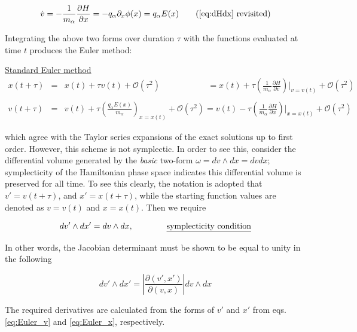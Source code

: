 \documentclass[11pt,titlepage]{report}
\begin{document}
\begin{equation*}
\dot{v} =  -\frac{1}{m_{\alpha}}\frac{\partial H}{\partial x} = -q_{\alpha}\partial_x\phi(x) = q_{\alpha}E(x) \tag{\ref{eq:dHdx} revisited}
\end{equation*}

\noindent Integrating the above two forms over duration $\tau$ with the functions evaluated at time $t$ produces the Euler method:

\vspace{2em}
\underline{Standard Euler method}\\[.3em]
\begin{eqnarray}
x(t + \tau ) & = & x(t) + \tau v(t) + \mathcal{O}(\tau^2) \qquad \qquad \quad \,\,\,\, = x(t) + \tau \left(\frac{1}{m_{\alpha}}\frac{\partial H}{\partial v}\right)\biggr|_{v = v(t)} + \mathcal{O}(\tau^2) \label{eq:Euler_x} \\
&& \nonumber \\
v(t + \tau ) & = & v(t) + \tau \left(\frac{q_{\alpha} E(x)}{m_{\alpha}}\right)_{x = x(t)} + \mathcal{O}(\tau^2) = v(t) - \tau \left(\frac{1}{m_{\alpha}} \frac{\partial H}{\partial x}\right)\biggr|_{x = x(t)} + \mathcal{O}(\tau^2) \label{eq:Euler_v}
\end{eqnarray}

\noindent which agree with the Taylor series expansions of the exact solutions up to first order. However, this scheme is not symplectic. In order to see this, consider the differential volume generated by the \emph{basic} two-form $\omega = dv \wedge dx = dvdx$; symplecticity of the Hamiltonian phase space indicates this differential volume is preserved for all time. To see this clearly, the notation is adopted that $v' = v(t + \tau )$, and $x' = x(t + \tau )$, while the starting function values are denoted as $v = v(t)$ and $x = x(t)$. Then we require

\begin{equation} dv' \wedge dx' = dv \wedge dx , \qquad \qquad \textrm{\underline{symplecticity condition}}\label{eq:symplectic_condition}\end{equation}

\noindent In other words, the Jacobian determinant must be shown to be equal to unity in the following

$$dv' \wedge dx'  =  \left|\frac{\partial (v',x')}{\partial(v,x)}\right| dv \wedge dx $$

The required derivatives are calculated from the forms of $v'$ and $x'$ from eqs. \eqref{eq:Euler_v} and \eqref{eq:Euler_x}, respectively.
\end{document}
